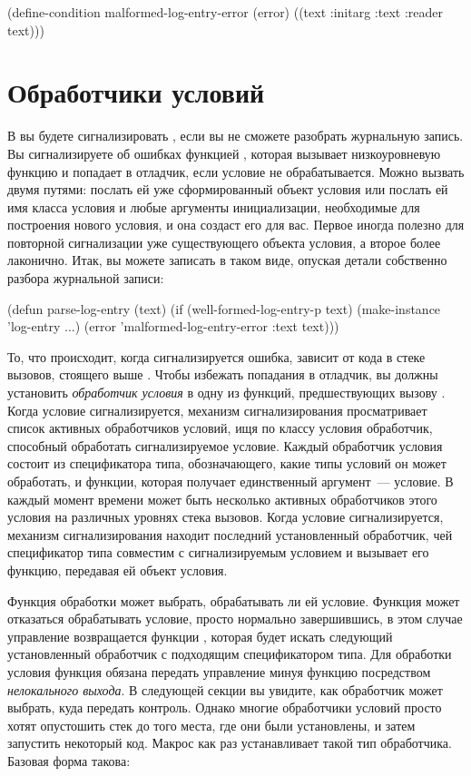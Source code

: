 \begin{myverb}
(define-condition malformed-log-entry-error (error)
  ((text :initarg :text :reader text)))
\end{myverb}

\section{Обработчики условий}

В  вы будете сигнализировать , если
вы не сможете разобрать журнальную запись. Вы сигнализируете об ошибках функцией
, которая вызывает низкоуровневую функцию  и попадает в отладчик,
если условие не обрабатывается. Можно вызвать  двумя путями: послать ей уже
сформированный объект условия или послать ей имя класса условия и любые аргументы
инициализации, необходимые для построения нового условия, и она создаст его для вас.
Первое иногда полезно для повторной сигнализации уже существующего объекта условия, а
второе более лаконично. Итак, вы можете записать  в таком виде,
опуская детали собственно разбора журнальной записи:

\begin{myverb}
(defun parse-log-entry (text)
  (if (well-formed-log-entry-p text)
    (make-instance 'log-entry ...)
    (error 'malformed-log-entry-error :text text)))
\end{myverb}

То, что происходит, когда сигнализируется ошибка, зависит от кода в стеке вызовов,
стоящего выше . Чтобы избежать попадания в отладчик, вы должны
установить \textit{обработчик условия} в одну из функций, предшествующих вызову
. Когда условие сигнализируется, механизм сигнализирования
просматривает список активных обработчиков условий, ищя по классу условия обработчик,
способный обработать сигнализируемое условие. Каждый обработчик условия состоит из
спецификатора типа, обозначающего, какие типы условий он может обработать, и функции,
которая получает единственный аргумент~--- условие. В каждый момент времени может быть
несколько активных обработчиков этого условия на различных уровнях стека вызовов. Когда
условие сигнализируется, механизм сигнализирования находит последний установленный
обработчик, чей спецификатор типа совместим с сигнализируемым условием и вызывает его
функцию, передавая ей объект условия.

Функция обработки может выбрать, обрабатывать ли ей условие. Функция может отказаться
обрабатывать условие, просто нормально завершившись, в этом случае управление возвращается
функции , которая будет искать следующий установленный обработчик с
подходящим спецификатором типа. Для обработки условия функция обязана передать управление
минуя функцию  посредством \textit{нелокального выхода}. В следующей секции
вы увидите, как обработчик может выбрать, куда передать контроль. Однако многие
обработчики условий просто хотят опустошить стек до того места, где они были установлены,
и затем запустить некоторый код. Макрос  как раз устанавливает такой
тип обработчика. Базовая форма  такова:

